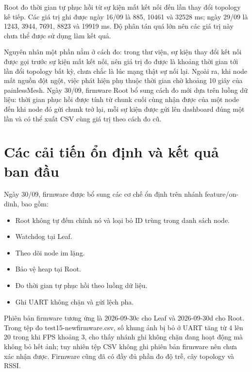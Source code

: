 Root đo thời gian tự phục hồi từ sự kiện mất kết nối đến lần thay đổi topology kế tiếp. Các giá trị ghi được ngày 16/09 là 885, 10461 và 32528 ms; ngày 29/09 là 1243, 3944, 7691, 8823 và 19919 ms. Độ phân tán quá lớn nên các giá trị này chưa thể được sử dụng làm kết quả.

Nguyên nhân một phần nằm ở cách đo: trong thư viện, sự kiện thay đổi kết nối được gọi trước sự kiện mất kết nối, nên giá trị đo được là khoảng thời gian tới lần đổi topology bất kỳ, chưa chắc là lúc mạng thật sự nối lại. Ngoài ra, khi node mất nguồn đột ngột, việc phát hiện phụ thuộc thời gian chờ khoảng 10 giây của painlessMesh. Ngày 30/09, firmware Root bổ sung cách đo mới dựa trên luồng dữ liệu: thời gian phục hồi được tính từ chunk cuối cùng nhận được của một node đến khi node đó gửi chunk trở lại, mỗi sự kiện được gửi lên dashboard đúng một lần và có thể xuất CSV cùng giá trị theo cách đo cũ. 


\section{Các cải tiến ổn định và kết quả ban đầu}

Ngày 30/09, firmware được bổ sung các cơ chế ổn định trên nhánh feature/on-dinh, bao gồm:
\begin{itemize}
    \item Root không tự đếm chính nó và loại bỏ ID trùng trong danh sách node.
    \item Watchdog tại Leaf.
    \item Theo dõi node im lặng.
    \item Bảo vệ heap tại Root.
    \item Đo thời gian tự phục hồi theo luồng dữ liệu.
    \item Ghi UART không chặn và gửi lệch pha.
\end{itemize}

Phiên bản firmware tương ứng là 2026-09-30c cho Leaf và 2026-09-30d cho Root. Trong tệp đo test15-newfirmware.csv, số khung ảnh bị bỏ ở UART tăng từ 4 lên 20 trong khi FPS khoảng 3, cho thấy nhánh ghi không chặn đang hoạt động mà không bỏ hết ảnh; tuy nhiên tệp CSV không ghi phiên bản firmware nên chưa xác nhận được. Firmware cũng đã có đầy đủ phần đo độ trễ, cây topology và RSSI. 


